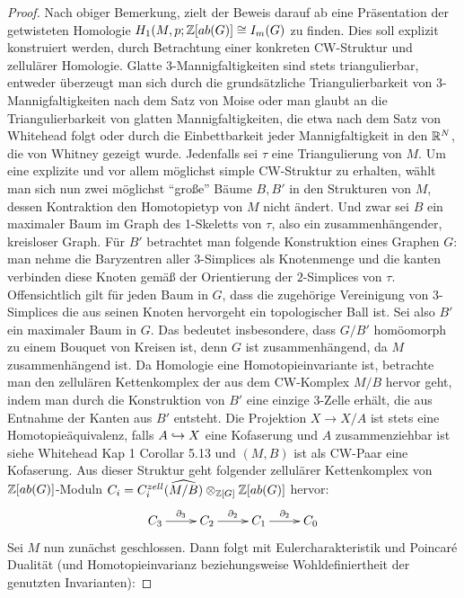 \begin{proof}
	Nach obiger Bemerkung, zielt der Beweis darauf ab eine Präsentation der getwisteten Homologie $H_1(M,p;\mathbb{Z}[ab(G)]\cong I_m(G)$ zu finden. Dies soll explizit konstruiert werden, durch Betrachtung einer konkreten CW-Struktur und zellulärer Homologie. Glatte 3-Mannigfaltigkeiten sind stets triangulierbar, entweder überzeugt man sich durch die grundsätzliche Triangulierbarkeit von 3-Mannigfaltigkeiten nach dem Satz von Moise oder man glaubt an die Triangulierbarkeit von glatten Mannigfaltigkeiten, die etwa nach dem Satz von Whitehead folgt oder durch die Einbettbarkeit jeder Mannigfaltigkeit in den $\mathbb{R}^N$, die von Whitney gezeigt wurde. Jedenfalls sei $\tau$ eine Triangulierung von $M$. Um eine explizite und vor allem möglichst simple CW-Struktur zu erhalten, wählt man sich nun zwei möglichst "`große"' Bäume $B,B'$ in den Strukturen von $M$, dessen Kontraktion den Homotopietyp von $M$ nicht ändert. Und zwar sei $B$ ein maximaler Baum im Graph des 1-Skeletts von $\tau$, also ein zusammenhängender, kreisloser Graph. Für $B'$ betrachtet man folgende Konstruktion eines Graphen $G$:  man nehme die Baryzentren aller $3$-Simplices als Knotenmenge und die kanten verbinden diese Knoten gemäß der Orientierung der $2$-Simplices von $\tau$. Offensichtlich gilt für jeden Baum in $G$, dass die zugehörige Vereinigung von $3$-Simplices die aus seinen Knoten hervorgeht ein topologischer Ball ist. Sei also $B'$ ein maximaler Baum in $G$. Das bedeutet insbesondere, dass $G/B'$ homöomorph zu einem Bouquet von Kreisen ist, denn $G$ ist zusammenhängend, da $M$ zusammenhängend ist. Da Homologie eine Homotopieinvariante ist, betrachte man den zellulären Kettenkomplex der aus dem CW-Komplex $M/B$ hervor geht, indem man durch die Konstruktion von $B'$ eine einzige 3-Zelle erhält, die aus Entnahme der Kanten aus $B'$ entsteht. Die Projektion $X \to X/A$ ist stets eine Homotopieäquivalenz, falls $A\hookrightarrow X$ eine Kofaserung und $A$ zusammenziehbar ist siehe Whitehead Kap 1 Corollar 5.13 und $(M,B)$ ist als CW-Paar eine Kofaserung. Aus dieser Struktur geht folgender zellulärer Kettenkomplex von $\mathbb{Z}[ab(G)]$-Moduln $C_i=C_i^{zell}(\widehat{M/B})\otimes_{\mathbb{Z}[G]}\mathbb{Z}[ab(G)]$ hervor:
	\[
		\begin{xy}
		\xymatrix{C_3 \ar[r]^{\partial_3}  &C_2 \ar[r]^{\partial_2}  &C_1 \ar[r]^{\partial_2} &C_0 }
		\end{xy}
	\]
	Sei $M$ nun zunächst geschlossen. Dann folgt mit Eulercharakteristik und Poincaré Dualität (und Homotopieinvarianz beziehungsweise Wohldefiniertheit der genutzten Invarianten):

\end{proof}
